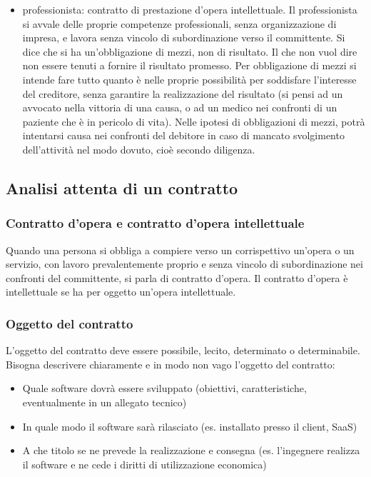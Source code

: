 \begin{itemize}
    \item professionista: contratto di prestazione d'opera intellettuale. Il professionista si avvale delle proprie competenze professionali,
    senza organizzazione di impresa, e lavora senza vincolo di subordinazione verso il committente.\newline
    Si dice che si ha un'obbligazione di mezzi, non di risultato. Il che non vuol dire non essere tenuti a fornire il risultato promesso. Per obbligazione
    di mezzi si intende fare tutto quanto è nelle proprie possibilità per soddisfare l'interesse del creditore, senza garantire la realizzazione
    del risultato (si pensi ad un avvocato nella vittoria di una causa, o ad un medico nei confronti di un paziente che è in pericolo di vita).\newline
    Nelle ipotesi di obbligazioni di mezzi, potrà intentarsi causa nei confronti del debitore in caso di mancato svolgimento dell'attività nel modo
    dovuto, cioè secondo diligenza.
\end{itemize}

\subsection{Analisi attenta di un contratto}
\subsubsection{Contratto d'opera e contratto d'opera intellettuale}
Quando una persona si obbliga a compiere verso un corrispettivo un'opera o un servizio, con lavoro prevalentemente proprio e senza vincolo di subordinazione
nei confronti del committente, si parla di contratto d'opera. \newline
Il contratto d'opera è intellettuale se ha per oggetto un'opera intellettuale.
\subsubsection{Oggetto del contratto}
L'oggetto del contratto deve essere possibile, lecito, determinato o determinabile.\newline
Bisogna descrivere chiaramente e in modo non vago l'oggetto del contratto:
\begin{itemize}
    \item Quale software dovrà essere sviluppato (obiettivi, caratteristiche, eventualmente in un allegato tecnico)
    \item In quale modo il software sarà rilasciato (es. installato presso il client, SaaS)
    \item A che titolo se ne prevede la realizzazione e consegna (es. l'ingegnere realizza il software e ne cede i diritti di
    utilizzazione economica)
\end{itemize}
